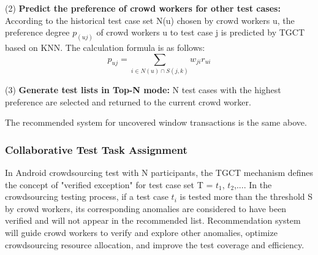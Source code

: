 
(2) \textbf{Predict the preference of crowd workers for other test cases:} According to the historical test case set N(u) chosen by crowd workers u, the preference degree $p_(uj)$ of crowd workers u to test case j is predicted by TGCT based on KNN. The calculation formula is as follows:
\begin{equation}
p_{uj} = \sum_{i\in N(u) \cap S(j,k)}w_{ji}r_{ui}
\end{equation}


(3) \textbf{Generate test lists in Top-N mode:} N test cases with the highest preference are selected and returned to the current crowd worker.

The recommended system for uncovered window transactions is the same above.

\subsubsection{Collaborative Test Task Assignment}
In Android crowdsourcing test with N participants, the TGCT mechanism defines the concept of "verified exception" for test case set T = {$t_{1}$, $t_{2}$,...}. In the crowdsourcing testing process, if a test case $t_{i}$ is tested more than the threshold S by crowd workers, its corresponding anomalies are considered to have been verified and will not appear in the recommended list. Recommendation system will guide crowd workers to verify and explore other anomalies, optimize crowdsourcing resource allocation, and improve the test coverage and efficiency.


